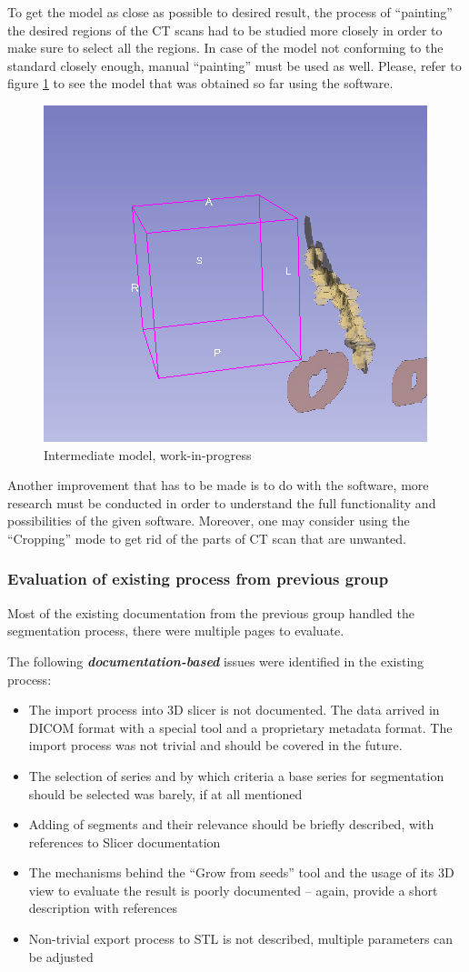 \documentclass[MME,Projekt,english]{twbook}%
\begin{document}
To get the model as close as possible to desired result, the process of “painting” the desired regions of the CT scans had to be studied more closely in order to make sure to select all the regions. In case of the model not conforming to the standard closely enough, manual “painting” must be used as well. Please, refer to figure \ref{5-intermediate-model} to see the model that was obtained so far using the software. 

\begin{figure}[!htbp]
	\centering
	\includegraphics[width=.4\linewidth]{images/existing-evaluation/5-intermediate-model}
	\caption{Intermediate model, work-in-progress}\label{5-intermediate-model}
\end{figure}

Another improvement that has to be made is to do with the software, more research must be conducted in order to understand the full functionality and possibilities of the given software. Moreover, one may consider using the “Cropping” mode to get rid of the parts of CT scan that are unwanted.

\subsubsection{Evaluation of existing process from previous group}

Most of the existing documentation from the previous group handled the segmentation process, there were multiple pages to evaluate.

The following \textbf{\emph{documentation-based}} issues were identified in the existing process:

\begin{itemize}
	\item The import process into 3D slicer is not documented. The data arrived in DICOM format with a special tool and a proprietary metadata format. The import process was not trivial and should be covered in the future.
	\item The selection of series and by which criteria a base series for segmentation should be selected was barely, if at all mentioned
	\item Adding of segments and their relevance should be briefly described, with references to Slicer documentation
	\item The mechanisms behind the “Grow from seeds” tool and the usage of its 3D view to evaluate the result is poorly documented – again, provide a short description with references
	\item Non-trivial export process to STL is not described, multiple parameters can be adjusted
\end{itemize}
\end{document}
